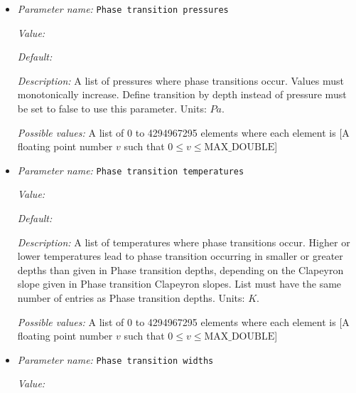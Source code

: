 \begin{itemize}
{\it Possible values:} A list of 0 to 4294967295 elements where each element is [A floating point number $v$ such that $0 \leq v \leq \text{MAX\_DOUBLE}$]
\item {\it Parameter name:} {\tt Phase transition pressures}
\label{parameters:Material model/Latent heat/Phase transition pressures}
\label{parameters:Material_20model/Latent_20heat/Phase_20transition_20pressures}


{\it Value:} 


{\it Default:} 


{\it Description:} A list of pressures where phase transitions occur. Values must monotonically increase. Define transition by depth instead of pressure must be set to false to use this parameter. Units: $Pa$.


{\it Possible values:} A list of 0 to 4294967295 elements where each element is [A floating point number $v$ such that $0 \leq v \leq \text{MAX\_DOUBLE}$]
\item {\it Parameter name:} {\tt Phase transition temperatures}
\label{parameters:Material model/Latent heat/Phase transition temperatures}
\label{parameters:Material_20model/Latent_20heat/Phase_20transition_20temperatures}


{\it Value:} 


{\it Default:} 


{\it Description:} A list of temperatures where phase transitions occur. Higher or lower temperatures lead to phase transition occurring in smaller or greater depths than given in Phase transition depths, depending on the Clapeyron slope given in Phase transition Clapeyron slopes. List must have the same number of entries as Phase transition depths. Units: $K$.


{\it Possible values:} A list of 0 to 4294967295 elements where each element is [A floating point number $v$ such that $0 \leq v \leq \text{MAX\_DOUBLE}$]
\item {\it Parameter name:} {\tt Phase transition widths}
\label{parameters:Material model/Latent heat/Phase transition widths}
\label{parameters:Material_20model/Latent_20heat/Phase_20transition_20widths}


{\it Value:} 



\end{itemize}
